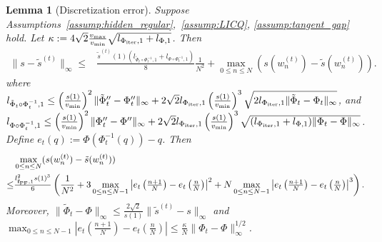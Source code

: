 \documentclass{article}
\newtheorem{lemma}{Lemma}
\newcommand{\f}{\mathbf{f}}
\newcommand{\Farc}{\Phi}
\begin{document}
\begin{lemma}[Discretization error]
\label{lem:s_tilde_combined_bound}
Suppose Assumptions~\ref{assump:hidden_regular},~\ref{assump:LICQ},
\ref{assump:tangent_gap} hold. Let $\kappa := 4\sqrt2\frac{v_{\max}}{v_{\min}} \sqrt{l_{\Farc_{\rm iter},1}+l_{\Farc,1}}$. Then
\begin{align}
\|s-\tilde s^{(t)}\|_\infty\le&\frac{\tilde s^{(t)}(1) (l_{\tilde\Farc_t\circ\Farc_t^{-1},1}+ l_{\Farc\circ\Farc_t^{-1},1})}{8} \frac{1}{N^2} + \max_{0\leq n\leq N} (s(w_n^{(t)})-\tilde s (w_n^{(t)})).
\label{eq:s_tilde_combined_bound}
\end{align}
where $l_{\tilde\Farc_t\circ\Farc_t^{-1},1}\le \left(\frac{s(1)}{v_{\min}}\right)^2\|\tilde\Farc_t''-\Farc_t''\|_\infty+2\sqrt2 l_{\Farc_{\rm iter},1}\left(\frac{s(1)}{v_{\min}}\right)^3\sqrt{2 l_{\Farc_{\rm iter},1}\|\tilde\Farc_t-\Farc_t\|_\infty}$, and $l_{\Farc\circ\Farc_t^{-1},1}\le \left(\frac{s(1)}{v_{\min}}\right)^2\|\Farc_t''-\Farc''\|_\infty+2\sqrt2 l_{\Farc_{\rm iter},1}\left(\frac{s(1)}{v_{\min}}\right)^3\sqrt{(l_{\Farc_{\rm iter},1}+l_{\Farc,1})\|\Farc_t-\Farc\|_\infty}$.
Define $e_t(q):=\Farc(\Farc_t^{-1}(q))-q$. Then
\begin{align}
& \max_{0\le n\le N} (s(w_n^{(t)})-\tilde s (w_n^{(t)})) %
\label{eq:nodal_chord_arc_bound_min}\\
\leq & 
\tfrac{l_{\tilde{\f}_{\rm PF},1}^2s(1)^3}{6}
\left(
\frac1{N^2}
+
3 \max_{0\le n\le N-1}
\left|e_t\left(\tfrac{n+1}{N}\right)-e_t\left(\tfrac{n}{N}\right)\right|^2 
+
N \max_{0\le n\le N-1}
\left|e_t\left(\tfrac{n+1}{N}\right)-e_t\left(\tfrac{n}{N}\right)\right|^3
\right).\nonumber
\end{align}
Moreover, $\|\tilde \Farc_t-\Farc\|_\infty \le \frac{2\sqrt2}{s(1)}\|\tilde s^{(t)}-s\|_\infty$ and $\max_{0\le n\le N-1}
\left|
e_t\left(\tfrac{n+1}{N}\right)
-
e_t\left(\tfrac nN\right)
\right|
\le \frac{\kappa}{N}\|\Farc_t-\Farc\|_\infty^{1/2}$.
\end{lemma}
\end{document}
